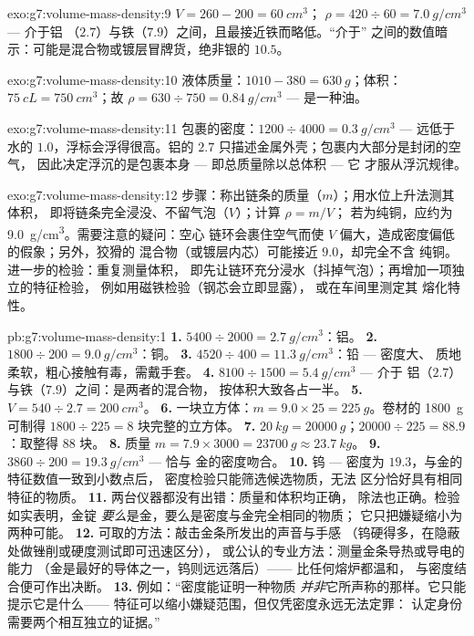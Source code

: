 \begin{solution}{exo:g7:volume-mass-density:9}
$V = 260 - 200 = \qty{60}{cm^3}$；
$\rho = 420 \div 60 = \qty{7.0}{g/cm^3}$ --- 介于铝
（$2.7$）与铁（$7.9$）之间，且最接近铁而略低。“介于”
之间的数值暗示：可能是混合物或镀层冒牌货，绝非银的
$10.5$。
\end{solution}

\begin{solution}{exo:g7:volume-mass-density:10}
液体质量：$1010 - 380 = \qty{630}{g}$；体积：
$\qty{75}{cL} = \qty{750}{cm^3}$；故 $\rho = 630 \div 750 =
\qty{0.84}{g/cm^3}$ --- 是一种油。
\end{solution}

\begin{solution}{exo:g7:volume-mass-density:11}
包裹的密度：$1200 \div 4000 = \qty{0.3}{g/cm^3}$ --- 远低于
水的 $1.0$，浮标会浮得很高。铝的 $2.7$
只描述金属外壳；包裹内大部分是封闭的空气，
因此决定浮沉的是包裹本身 --- 即总质量除以总体积 --- 它
才服从浮沉规律。
\end{solution}

\begin{solution}{exo:g7:volume-mass-density:12}
步骤：称出链条的质量（$m$）；用水位上升法测其体积，
即将链条完全浸没、不留气泡（$V$）；计算 $\rho = m/V$；
若为纯铜，应约为 \qty{9.0}{g/cm^3}。需要注意的疑问：空心
链环会裹住空气而使 $V$ 偏大，造成密度偏低的假象；另外，狡猾的
混合物（或镀层内芯）可能接近 $9.0$，却完全不含
纯铜。进一步的检验：重复测量体积，
即先让链环充分浸水（抖掉气泡）；再增加一项独立的特征检验，
例如用磁铁检验（钢芯会立即显露），
或在车间里测定其
熔化特性。
\end{solution}

\begin{solution}{pb:g7:volume-mass-density:1}
\textbf{1.} $5400 \div 2000 = \qty{2.7}{g/cm^3}$：铝。
\textbf{2.} $1800 \div 200 = \qty{9.0}{g/cm^3}$：铜。
\textbf{3.} $4520 \div 400 = \qty{11.3}{g/cm^3}$：铅 --- 密度大、
质地柔软，粗心接触有毒，需戴手套。
\textbf{4.} $8100 \div 1500 = \qty{5.4}{g/cm^3}$ --- 介于
铝（$2.7$）与铁（$7.9$）之间：是两者的混合物，
按体积大致各占一半。
\textbf{5.} $V = 540 \div 2.7 = \qty{200}{cm^3}$。
\textbf{6.} 一块立方体：$m = 9.0 \times 25 = \qty{225}{g}$。卷材的
\qty{1800}{g} 可制得 $1800 \div 225 = 8$ 块完整的立方体。
\textbf{7.} $\qty{20}{kg} = \qty{20000}{g}$；$20000 \div 225 =
88.9$：取整得 $88$ 块。
\textbf{8.} 质量 $m = 7.9 \times 3000 = \qty{23700}{g} \approx
\qty{23.7}{kg}$。
\textbf{9.} $3860 \div 200 = \qty{19.3}{g/cm^3}$ --- 恰与
金的密度吻合。
\textbf{10.} 钨 --- 密度为 $19.3$，与金的特征数值一致到小数点后，
密度检验只能筛选候选物质，无法
区分恰好具有相同特征的物质。
\textbf{11.} 两台仪器都没有出错：质量和体积均正确，
除法也正确。检验如实表明，金锭
\emph{要么}是金，要么是密度与金完全相同的物质；
它只把嫌疑缩小为两种可能。
\textbf{12.} 可取的方法：敲击金条所发出的声音与手感
（钨硬得多，在隐蔽处做锉削或硬度测试即可迅速区分），
或公认的专业方法：测量金条导热或导电的能力
（金是最好的导体之一，钨则远远落后）——
比任何熔炉都温和，
与密度结合便可作出决断。
\textbf{13.} 例如：“密度能证明一种物质
\emph{并非}它所声称的那样。它只能提示它是什么——
特征可以缩小嫌疑范围，但仅凭密度永远无法定罪：
认定身份需要两个相互独立的证据。”
\end{solution}
